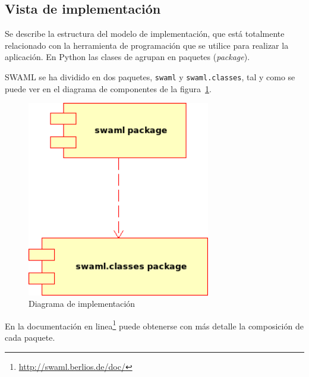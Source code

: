 
\subsection{Vista de implementación}

Se describe la estructura del modelo de implementación, que está totalmente 
relacionado con la herramienta de programación que se utilice para realizar 
la aplicación. En Python las clases de agrupan en paquetes (\textit{package}).

SWAML se ha dividido en dos paquetes, \texttt{swaml} y \texttt{swaml.classes},
tal y como se puede ver en el diagrama de componentes de la 
figura~\ref{fig:uml:implementación}.

\begin{figure}[H]
	\centering
	\includegraphics[width=8cm]{images/uml/implementacion.png}
	\caption{Diagrama de implementación}
	\label{fig:uml:implementación}
\end{figure}

En la documentación en linea\footnote{\url{http://swaml.berlios.de/doc/}}
puede obtenerse con más detalle la composición de cada paquete.